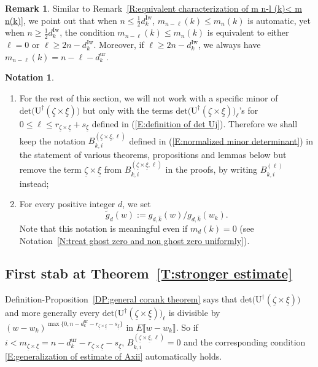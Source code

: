 \documentclass[12pt]{amsart}
\theoremstyle{definition}
\newtheorem{remark}[subsection]{Remark}
\newtheorem{notation}[subsection]{Notation}
\numberwithin{equation}{subsection}
\def\rmU{\mathrm{U}}
\newcommand{\new}{\mathrm{new}}
\newcommand{\Iw}{\mathrm{Iw}}
\renewcommand{\det}{\mathrm{det}}
\newcommand{\ur}{\mathrm{ur}}
\begin{document}
\begin{remark}\label{R:equivalent characterization of m n-l (k) leq m n(k)}
Similar to Remark~\ref{R:equivalent characterization of m n-l (k)< m n(k)}, we point out that when $n \leq \frac 12d_k^\Iw$, $m_{n-\ell}(k) \leq m_n(k)$ is automatic, yet when $n\geq \frac 12 d_k^\Iw$, the condition $m_{n-\ell}(k)\leq m_n(k)$ is equivalent to either $\ell=0$ or $\ell\geq 2n-d_k^\Iw$. Moreover, if $\ell \geq 2n-d_k^\Iw$, we always have $m_{n-\ell}(k)=n-\ell-d_k^\ur$. %
\end{remark}

\begin{notation}\label{N:simplify B k,i (zeta xi, ell)}
	\begin{enumerate}
		\item For the rest of this section, we will not work with a specific minor of $\det\big(\rmU^\dagger (\underline \zeta\times \underline \xi) \big)$ but only with the terms $\det\big(\rmU^\dagger (\underline \zeta\times \underline \xi) \big)_\ell$'s for $0\leq \ell \leq r_{\underline \zeta\times \underline \xi}+s_{\underline \xi}$ defined in (\ref{E:definition of det Uj}). Therefore we shall keep the notation $B_{k,i}^{(\underline \zeta\times \underline \xi, \ell)}$ defined in (\ref{E:normalized minor determinant}) in the statement of various theorems, propositions and lemmas below but remove the term $\underline \zeta\times\underline \xi$ from $B_{k,i}^{(\underline \zeta\times \underline \xi, \ell)}$ in the proofs, by writing $B_{k,i}^{(\ell)}$ instead;
		\item For every positive integer $d$, we set $$\tilde{g}_d(w):=g_{d,\hat{k}}(w)/g_{d,\hat{k}}(w_k).$$ Note that this notation is meaningful even if $m_d(k)=0$ (see Notation~\ref{N:treat ghost zero and non ghost zero uniformly}).
	\end{enumerate}
\end{notation}


\subsection{First stab at Theorem~\ref{T:stronger estimate}}
\label{S:first stab at final estimate}
Definition-Proposition~\ref{DP:general corank theorem} says that $\det\big(\rmU^\dagger(\underline \zeta \times \underline \xi)\big)$ and more generally every $\det\big(\rmU^\dagger(\underline \zeta \times \underline \xi)\big)_\ell$ is divisible by $(w-w_k)^{\max\{0,n-d_k^\ur-r_{\underline \zeta \times \underline \xi}-s_{\underline \xi}\}}$ in $E\llbracket w-w_k\rrbracket$. So 
if $i< m_{\underline \zeta \times \underline \xi} = n-d_k^\ur-r_{\underline \zeta \times \underline \xi}-s_{\underline \xi}$, $B_{k,i}^{(\underline \zeta \times \underline \xi, \ell)} = 0$ and the corresponding condition \eqref{E:generalization of estimate of Axii} automatically holds.
\end{document}
